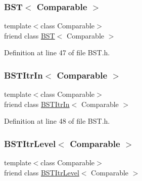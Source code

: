 \subsubsection{\texorpdfstring{B\+S\+T$<$ Comparable $>$}{BST< Comparable >}}
{\footnotesize\ttfamily template$<$class Comparable$>$ \\
friend class \hyperlink{class_b_s_t}{B\+ST}$<$ Comparable $>$\hspace{0.3cm}{\ttfamily [friend]}}



Definition at line 47 of file B\+S\+T.\+h.

\hypertarget{class_binary_node_aab3993acac2ab24a0b59edb0c3acc775}{}\label{class_binary_node_aab3993acac2ab24a0b59edb0c3acc775} 
\subsubsection{\texorpdfstring{B\+S\+T\+Itr\+In$<$ Comparable $>$}{BSTItrIn< Comparable >}}
{\footnotesize\ttfamily template$<$class Comparable$>$ \\
friend class \hyperlink{class_b_s_t_itr_in}{B\+S\+T\+Itr\+In}$<$ Comparable $>$\hspace{0.3cm}{\ttfamily [friend]}}



Definition at line 48 of file B\+S\+T.\+h.

\hypertarget{class_binary_node_a26ff00bc0d87069aed877f10fd3c80a8}{}\label{class_binary_node_a26ff00bc0d87069aed877f10fd3c80a8} 
\subsubsection{\texorpdfstring{B\+S\+T\+Itr\+Level$<$ Comparable $>$}{BSTItrLevel< Comparable >}}
{\footnotesize\ttfamily template$<$class Comparable$>$ \\
friend class \hyperlink{class_b_s_t_itr_level}{B\+S\+T\+Itr\+Level}$<$ Comparable $>$\hspace{0.3cm}{\ttfamily [friend]}}



